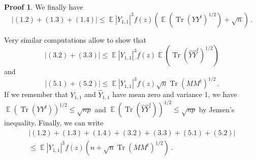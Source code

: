 \documentclass[11pt,a4paper]{article}
\DeclareMathOperator{\E}{\mathbb{E}}
\DeclareMathOperator{\1}{\mathbf{1}}
\DeclareMathOperator{\Tr}{\mathrm{Tr}}
\newcommand{\Yhat}{\widehat{Y}}
\theoremstyle{definition}
\newtheorem*{Proof}{Proof}
\begin{document}
\begin{Proof}
We finally have
\begin{equation}
|(1.2)+(1.3)+(1.4)| \le \E|Y_{1,1}|^3 f(z) \left( \E (\Tr(YY^t)^{1/2}) + \sqrt{n} \right) \, .
\end{equation}

Very similar computations allow to show that
\begin{displaymath}
|(3.2)+(3.3)| \le \E|Y_{1,1}|^3 f(z) \E (\Tr(\Yhat\Yhat^t)^{1/2})
\end{displaymath}
and
\begin{equation}
|(5.1)+(5.2)| \le \E|Y_{1,1}|^3 f(z) \sqrt{n} \Tr(MM^t)^{1/2} \, .
\end{equation}
If we remember that $Y_{1,1}$ and $\Yhat_{1,1}$ have mean zero and variance 1, we have $\E (\Tr(YY^t))^{1/2} \le \sqrt{np}$ and $\E (\Tr(\Yhat\Yhat^t))^{1/2} \le \sqrt{np}$ by Jensen's inequality. Finally, we can write
\begin{multline} \label{freeness_general_eq10}
|(1.2)+(1.3)+(1.4)+(3.2)+(3.3)+(5.1)+(5.2)| \\
\le \E|Y_{1,1}|^3 f(z) \left( n + \sqrt{n} \Tr(MM^t)^{1/2} \right) \, .
\end{multline}\\


\end{Proof}
\end{document}
